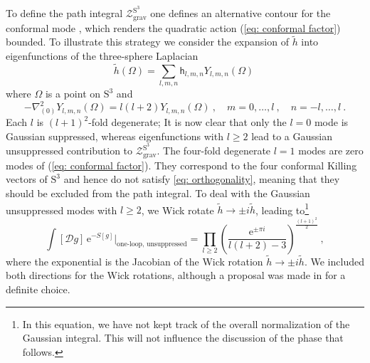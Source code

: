 \documentclass[12pt,a4paper]{article}
\renewcommand{\ge}{\geqslant}
\renewcommand{\geq}{\geqslant}
\begin{document}
To define the path integral $\mathcal{Z}_{\mathrm{grav}}^{\text{S}^3}$ one defines an alternative contour for the conformal mode \cite{Gibbons:1978ac, Polchinski:1988ua}, which renders the quadratic action (\ref{eq: conformal factor}) bounded. To illustrate this strategy we consider the expansion of $\tilde{h}$ into eigenfunctions of the three-sphere Laplacian 
\begin{equation}\label{eq: mode expansion}
    \tilde{h}(\Omega) = \sum_{l,m,n}\mathsf{h}_{l,m,n} Y_{l,m,n}(\Omega)~
\end{equation}
where $\Omega$ is a point on $\text{S}^3$ and
\begin{equation}
    -{\nabla}_{(0)}^2 Y_{l,m, n}(\Omega) = l(l+2)Y_{l, m, n}(\Omega)~,\quad m=0,\ldots , l~,\quad n= -l,\ldots ,l~.
\end{equation}
Each $l$ is $(l+1)^2$-fold degenerate; It is now clear that only the $l=0$ mode is Gaussian suppressed, whereas eigenfunctions with $l\geq 2$ lead to a Gaussian unsuppressed contribution to $\mathcal{Z}_{\mathrm{grav}}^{\text{S}^3}$. The four-fold degenerate $l=1$ modes are zero modes of (\ref{eq: conformal factor}). They correspond to the four conformal Killing vectors of $\text{S}^3$ and hence do not satisfy \eqref{eq: orthogonality}, meaning that they should be excluded from the path integral. To deal with the Gaussian unsuppressed modes with $l \ge 2$, we Wick rotate $\tilde{h}\rightarrow \pm i\tilde{h}$, leading to\footnote{In this equation, we have not kept track of the overall normalization of the Gaussian integral. This will not influence the discussion of the phase that follows.} 
\begin{equation}\label{eq:infinite product}
    \int [\mathcal{D}g]\, \mathrm{e}^{-S[g]}\bigg|_{\text{one-loop, unsuppressed}} =  \prod_{l \ge 2}\left(\frac{\mathrm{e}^{\pm {\pi i}}}{l(l+2)-3}\right)^{\frac{(l+1)^2}{2}}~,
\end{equation}
where the exponential is the Jacobian of the Wick rotation $\tilde{h}\rightarrow \pm i \tilde{h}$. We included both directions for the Wick rotations, although a proposal was made in \cite{Maldacena:2024spf} for a definite choice. 
\end{document}
